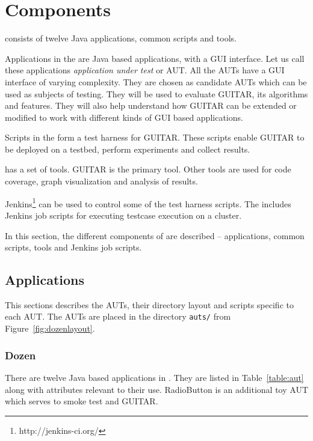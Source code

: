 %
%
\section{Components}
\label{sec:components}

\mddozen{} consists of twelve Java applications, common scripts and tools.

Applications in the \mddozen{} are Java based applications, with a GUI interface. Let us call these applications \textit{application under test} or AUT. All the AUTs have a GUI interface of varying complexity. They are chosen as candidate AUTs which can be used as subjects of testing. They will be used to evaluate GUITAR, its algorithms and features. They will also help understand how GUITAR can be extended or modified to work with different kinds of GUI based applications.

Scripts in the \mddozen{} form a test harness for GUITAR. These scripts enable GUITAR to be deployed on a testbed, perform experiments and collect results.

\mddozen{} has a set of tools. GUITAR is the primary tool. Other tools are used for code coverage, graph visualization and analysis of results.

Jenkins\footnote{http://jenkins-ci.org/} can be used to control some of the test harness scripts. The \mddozen{} includes Jenkins job scripts for executing testcase execution on a cluster.

In this section, the different components of \mddozen{} are described -- applications, common scripts, tools and Jenkins job scripts.


\subsection{Applications}

This sections describes the AUTs, their directory layout and scripts specific to each AUT. The AUTs are placed in the directory \texttt{auts/} from Figure~\ref{fig:dozenlayout}.

%
%
\subsubsection{Dozen}

There are twelve Java based applications in \mddozen{}. They are listed in Table~\ref{table:aut} along with attributes relevant to their use. RadioButton is an additional toy AUT which serves to smoke test \mddozen{} and GUITAR.

